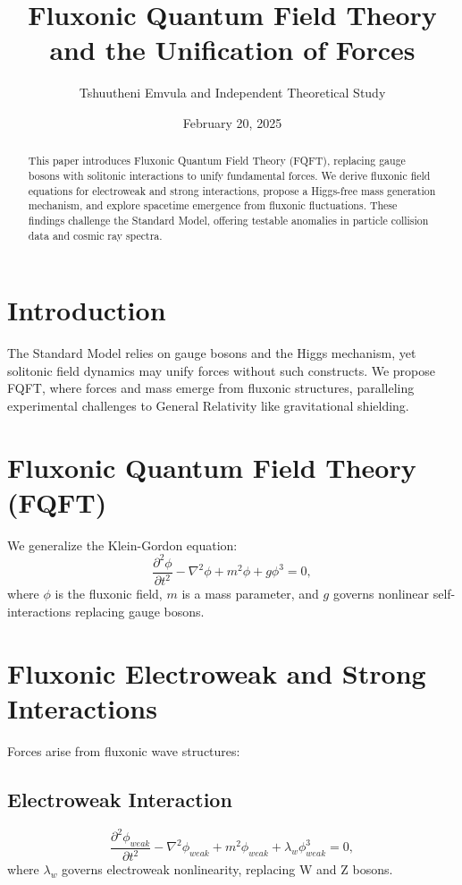 \documentclass{article}
\title{Fluxonic Quantum Field Theory and the Unification of Forces}
\author{Tshuutheni Emvula and Independent Theoretical Study}
\date{February 20, 2025}
\begin{document}
\maketitle

\begin{abstract}
This paper introduces Fluxonic Quantum Field Theory (FQFT), replacing gauge bosons with solitonic interactions to unify fundamental forces. We derive fluxonic field equations for electroweak and strong interactions, propose a Higgs-free mass generation mechanism, and explore spacetime emergence from fluxonic fluctuations. These findings challenge the Standard Model, offering testable anomalies in particle collision data and cosmic ray spectra.
\end{abstract}

\section{Introduction}
The Standard Model relies on gauge bosons and the Higgs mechanism, yet solitonic field dynamics may unify forces without such constructs. We propose FQFT, where forces and mass emerge from fluxonic structures, paralleling experimental challenges to General Relativity like gravitational shielding.

\section{Fluxonic Quantum Field Theory (FQFT)}
We generalize the Klein-Gordon equation:
\begin{equation}
\frac{\partial^2 \phi}{\partial t^2} - \nabla^2 \phi + m^2 \phi + g \phi^3 = 0,
\end{equation}
where \(\phi\) is the fluxonic field, \(m\) is a mass parameter, and \(g\) governs nonlinear self-interactions replacing gauge bosons.

\section{Fluxonic Electroweak and Strong Interactions}
Forces arise from fluxonic wave structures:

\subsection{Electroweak Interaction}
\begin{equation}
\frac{\partial^2 \phi_{weak}}{\partial t^2} - \nabla^2 \phi_{weak} + m^2 \phi_{weak} + \lambda_w \phi_{weak}^3 = 0,
\end{equation}
where \(\lambda_w\) governs electroweak nonlinearity, replacing W and Z bosons.
\end{document}

